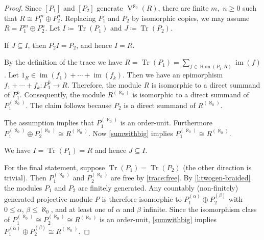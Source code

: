 \documentclass[a4paper,11pt,oneside]{amsart}
\theoremstyle{remark}
\DeclareMathOperator{\Hom}{Hom}
\DeclareMathOperator{\im}{im}
\DeclareMathOperator{\Tr}{Tr}
\DeclareMathOperator{\Vmon}{V}
\begin{document}
\begin{proof}
  Since $[P_1]$ and $[P_2]$ generate $\Vmon^{\aleph_0}(R)$, there are finite $m$,~$n \ge 0$ such that $R \cong P_1^m \oplus P_2^n$.
  Replacing $P_1$ and $P_2$ by isomorphic copies, we may assume $R=P_1^m \oplus P_2^n$.
  Let $I\coloneqq \Tr(P_1)$ and $J\coloneqq \Tr(P_2)$.

  \begin{proofenumerate}
  \item[\ref{trace:ji}$\,\Rightarrow\,$\ref{trace:ir}] If $J \subseteq I$, then $P_2I = P_2$, and hence $I=R$.

  \item[\ref{trace:ir}$\,\Rightarrow\,$\ref{trace:summand}]
  By the definition of the trace we have $R = \Tr(P_1)= \sum_{f \in \Hom(P_1,R)} \im(f)$.
  Let $1_R \in \im(f_1) + \cdots + \im(f_k)$.
  Then we have an epimorphism $f_1 + \cdots + f_k :  P_1^k  \to R$.
  Therefore, the module $R$ is isomorphic to a direct summand of $P_1^k$.
  Consequently, the module $R^{(\aleph_0)}$ is isomorphic to a direct summand of $P_1^{(\aleph_0)}$.
  The claim follows because $P_2$ is a direct summand of $R^{(\aleph_0)}$.

  \item[\ref{trace:summand}$\,\Rightarrow\,$\ref{trace:free}]
  The assumption implies that $P_1^{(\aleph_0)}$ is an order-unit.
  Furthermore $P_1^{(\aleph_0)} \oplus P_2^{(\aleph_0)} \cong R^{(\aleph_0)}$.
  Now \cref{sumwithbig} implies $P_1^{(\aleph_0)} \cong R^{(\aleph_0)}$.

  \item[\ref{trace:free}$\,\Rightarrow\,$\ref{trace:ji}]
  We have $I=\Tr(P_1)=R$ and hence $J \subseteq I$.
  \end{proofenumerate}

  For the final statement, suppose $\Tr(P_1)=\Tr(P_2)$ (the other direction is trivial).
  Then $P_1^{(\aleph_0)}$ and $P_2^{(\aleph_0)}$ are free by \ref{trace:free}.
  By \cref{l:twogen-braided} the modules $P_1$ and $P_2$ are finitely generated.
  Any countably (non-finitely) generated projective module $P$ is therefore isomorphic to $P_1^{(\alpha)} \oplus P_2^{(\beta)}$ with $0 \le \alpha$, $\beta \le \aleph_0$, and at least one of $\alpha$ and $\beta$ infinite.
  Since the isomorphism class of $P_1^{(\aleph_0)}\cong P_2^{(\aleph_0)} \cong R^{(\aleph_0)}$ is an order-unit, \cref{sumwithbig} implies $P_1^{(\alpha)} \oplus P_2^{(\beta)} \cong R^{(\aleph_0)}$.
\end{proof}
\end{document}
